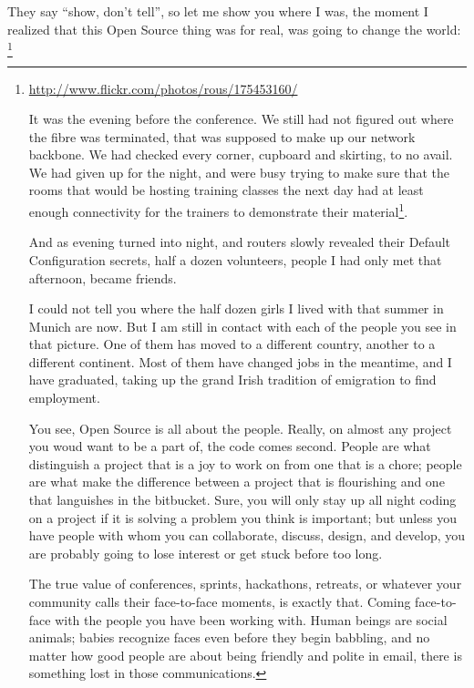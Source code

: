 They say ``show, don't tell'', so let me show you where I was, the
moment I realized that this Open Source thing was for real, was going
to change the world: \footnote{\url{
http://www.flickr.com/photos/rous/175453160/} 

It was the evening before the conference. We still had not figured out
where the fibre was terminated, that was supposed to make up our
network backbone. We had checked every corner, cupboard and skirting, to
no avail. We had given up for the night, and were busy trying to make
sure that the rooms that would be hosting training classes the next
day had at least enough connectivity for the trainers to demonstrate
their material\footnote{The next morning, we checked up in the roof space, to
try and find
the fibre; still no joy. In the end, we found it in the comms cupboard
of the nightclub in the basement next door.}.

And as evening turned into night, and routers slowly revealed their
Default Configuration secrets, half a dozen volunteers, people I had
only met that afternoon, became friends.

I could not tell you where the half dozen girls I lived with that
summer in Munich are now. But I am still in contact with each of the
people you see in that picture. One of them has moved to a different
country, another to a different continent. Most of them have changed
jobs in the meantime, and I have graduated, taking up the grand Irish
tradition of emigration to find employment.

You see, Open Source is all about the people. Really, on almost any
project you woud want to be a part of, the code comes second. People are
what distinguish a project that is a joy to work on from one that is a
chore; people are what make the difference between a project that is
flourishing and one that languishes in the bitbucket. Sure, you will
only stay up all night coding on a project if it is solving a problem
you think is important; but unless you have people with whom you can
collaborate, discuss, design, and develop, you are probably going to
lose interest or get stuck before too long.

The true value of conferences, sprints, hackathons, retreats, or
whatever your community calls their face-to-face moments, is exactly
that. Coming face-to-face with the people you have been working with.
Human beings are social animals; babies recognize faces even before
they begin babbling, and no matter how good people are about being
friendly and polite in email, there is something lost in those
communications.

}

